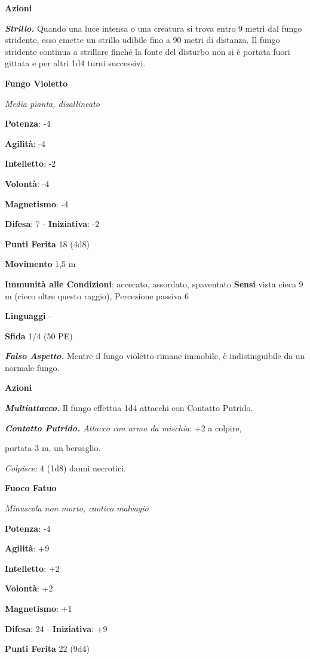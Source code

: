 \begin{multicols}{2}
\smallskip\textbf{Azioni}

\emph{\textbf{Strillo.}} Quando una luce intensa o una creatura si trova
entro 9 metri dal fungo stridente, esso emette un strillo udibile fino a
90 metri di distanza. Il fungo stridente continua a strillare finché la
fonte del disturbo non si è portata fuori gittata e per altri 1d4 turni
successivi.

\textbf{Fungo Violetto}

\emph{Media pianta, disallineato}

\textbf{Potenza}: -4

\textbf{Agilità}: -4

\textbf{Intelletto}: -2

\textbf{Volontà}: -4

\textbf{Magnetismo}: -4

\textbf{Difesa}: 7 - \textbf{Iniziativa}: -2

\textbf{Punti Ferita} 18 (4d8)

\textbf{Movimento} 1,5 m

\textbf{Immunità alle Condizioni}: accecato, assordato, spaventato
\textbf{Sensi} vista cieca 9 m (cieco oltre questo raggio), Percezione
passiva 6

\textbf{Linguaggi} -

\textbf{Sfida} 1/4 (50 PE)\smallskip

\emph{\textbf{Falso Aspetto.}} Mentre il fungo violetto rimane immobile,
è indistinguibile da un normale fungo.

\smallskip\textbf{Azioni}

\emph{\textbf{Multiattacco.}} Il fungo effettua 1d4 attacchi con
Contatto Putrido.

\emph{\textbf{Contatto Putrido.} Attacco con arma da mischia}: +2 a
colpire,

portata 3 m, un bersaglio.

\emph{Colpisce:} 4 (1d8) danni necrotici.

\textbf{Fuoco Fatuo}

\emph{Minuscola non morto, caotico malvagio}

\textbf{Potenza}: -4

\textbf{Agilità}: +9

\textbf{Intelletto}: +2

\textbf{Volontà}: +2

\textbf{Magnetismo}: +1

\textbf{Difesa}: 24 - \textbf{Iniziativa}: +9

\textbf{Punti Ferita} 22 (9d4)


\end{multicols}
